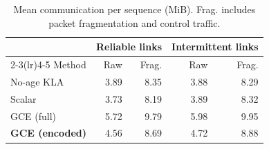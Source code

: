 \begin{table}[t]
\centering\small
\vspace*{5pt}
\caption{Mean communication per sequence (MiB). Frag. includes packet fragmentation and control traffic.}
\label{tab:communication}
\setlength{\tabcolsep}{3.5pt}
\begin{tabular*}{\columnwidth}{@{\extracolsep{\fill}}lrrrr@{}}
\toprule
& \multicolumn{2}{c}{Reliable links} & \multicolumn{2}{c}{Intermittent links} \\
\cmidrule(lr){2-3}\cmidrule(lr){4-5}
Method & Raw & Frag. & Raw & Frag. \\
\midrule
No-age KLA & 3.89 & 8.35 & 3.88 & 8.29 \\
Scalar & 3.73 & 8.19 & 3.89 & 8.32 \\
\midrule
GCE (full) & 5.72 & 9.79 & 5.98 & 9.95 \\
\textbf{GCE (encoded)} & 4.56 & 8.69 & 4.72 & 8.88 \\
\bottomrule
\end{tabular*}
\end{table}
